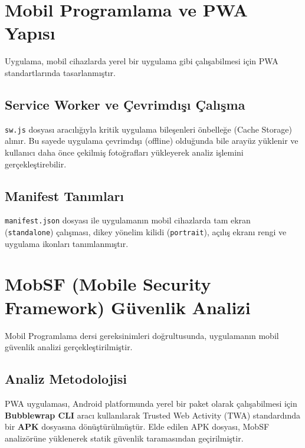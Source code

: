 \documentclass[12pt,a4paper]{article}
\begin{document}
\section{Mobil Programlama ve PWA Yapısı}
Uygulama, mobil cihazlarda yerel bir uygulama gibi çalışabilmesi için PWA standartlarında tasarlanmıştır.

\subsection{Service Worker ve Çevrimdışı Çalışma}
\lstinline{sw.js} dosyası aracılığıyla kritik uygulama bileşenleri önbelleğe (Cache Storage) alınır. Bu sayede uygulama çevrimdışı (offline) olduğunda bile arayüz yüklenir ve kullanıcı daha önce çekilmiş fotoğrafları yükleyerek analiz işlemini gerçekleştirebilir.

\subsection{Manifest Tanımları}
\lstinline{manifest.json} dosyası ile uygulamanın mobil cihazlarda tam ekran (\lstinline{standalone}) çalışması, dikey yönelim kilidi (\lstinline{portrait}), açılış ekranı rengi ve uygulama ikonları tanımlanmıştır.

\section{MobSF (Mobile Security Framework) Güvenlik Analizi}
Mobil Programlama dersi gereksinimleri doğrultusunda, uygulamanın mobil güvenlik analizi gerçekleştirilmiştir.

\subsection{Analiz Metodolojisi}
PWA uygulaması, Android platformunda yerel bir paket olarak çalışabilmesi için \textbf{Bubblewrap CLI} aracı kullanılarak Trusted Web Activity (TWA) standardında bir \textbf{APK} dosyasına dönüştürülmüştür. Elde edilen APK dosyası, MobSF analizörüne yüklenerek statik güvenlik taramasından geçirilmiştir.
\end{document}
